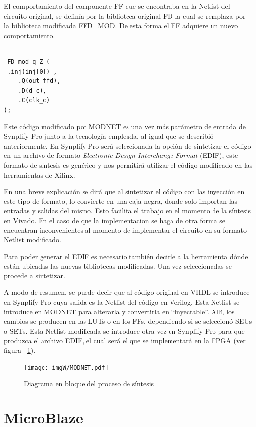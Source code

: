 \documentclass[a4paper,openright,12pt]{report}
\begin{document}
El comportamiento del componente FF que se encontraba en la Netlist del circuito original, se definía por la biblioteca original FD la cual se remplaza  por la biblioteca modificada FFD\_MOD.  De esta forma el FF adquiere un nuevo comportamiento.
\begin{lstlisting}

 FD_mod q_Z (
 .inj(inj[0]) ,
    .Q(out_ffd),
    .D(d_c),
    .C(clk_c)
);
\end{lstlisting}

Este código modificado por MODNET es una vez más parámetro de entrada de Synplify Pro junto a la tecnología empleada,  al igual que se describió anteriormente. En Synplify Pro  será seleccionada la opción de sintetizar el código en un archivo de formato \textit{Electronic Design Interchange Format} (EDIF), este formato de síntesis es genérico y nos permitirá utilizar el código modificado en las herramientas de Xilinx.

En una breve explicación se dirá  que al sintetizar el código con las inyección en este tipo de formato, lo convierte en una caja negra, donde solo  importan las entradas y salidas del mismo. Esto facilita el trabajo en el momento de la síntesis en Vivado. En el caso de que la implementacion se haga de otra forma se encuentran  inconvenientes  al momento de implementar el circuito en su formato Netlist modificado.

Para poder generar el EDIF es necesario también decirle a la herramienta dónde están ubicadas las nuevas bibliotecas modificadas. Una vez seleccionadas  se procede a  sintetizar.

A modo de resumen, se puede decir que al código original en VHDL se introduce en Synplify Pro cuya  salida es la Netlist del código en Verilog. Esta Netlist se introduce en MODNET para alterarla y convertirla en “inyectable”.  Allí, los cambios se producen en las LUTs o en los FFs, dependiendo si se seleccionó SEUs o SETs. Esta Netlist modificada se introduce  otra vez en Synplify Pro  para que produzca el archivo EDIF, el cual será el que se implementará en la FPGA (ver figura ~\ref{MODNET}).


\begin{figure}[H]
	\centering
	\texttt{[image: imgW/MODNET.pdf]}
	\caption{Diagrama en bloque del proceso de síntesis}
	\label{MODNET}
\end{figure}


\section{MicroBlaze}
\end{document}

